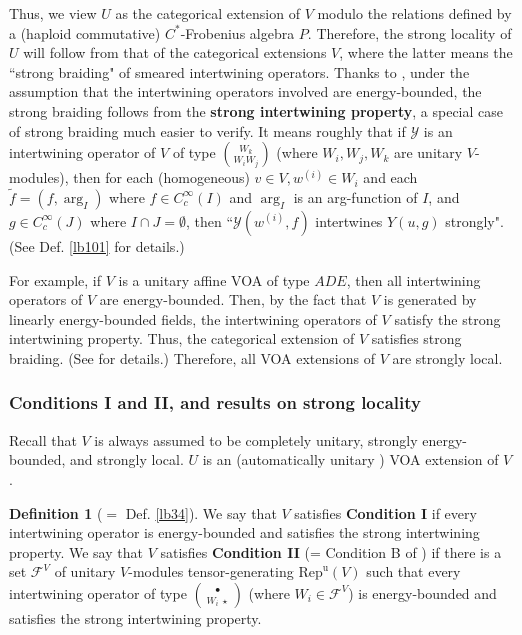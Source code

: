 \documentclass[11pt,b5paper,notitlepage]{article}
\theoremstyle{definition}
\newtheorem{df}{Definition}[section]
\theoremstyle{plain}
\newcommand{\mc}{\mathcal}
\newcommand{\wtd}{\widetilde}
\newcommand{\uni}{\mathrm{u}}
\newcommand{\RepV}{{\mathrm{Rep}^\uni(V)}}
\newcommand{\blt}{\bullet}
\numberwithin{equation}{section}
\begin{document}
Thus, we view $U$ as the categorical extension of $V$ modulo the relations defined by a (haploid commutative) $C^*$-Frobenius algebra $P$. Therefore, the strong locality of $U$ will follow from that of the categorical extensions $V$, where the latter means the ``strong braiding" of smeared intertwining operators. Thanks to \cite{Gui20}, under the assumption that the intertwining operators involved are energy-bounded, the strong braiding follows from the \textbf{strong intertwining property}, a special case of strong braiding much easier to verify. It means roughly that if $\mc Y$ is an intertwining operator of $V$ of type $W_k\choose W_iW_j$ (where $W_i,W_j,W_k$ are unitary $V$-modules), then for each (homogeneous) $v\in V,w^{(i)}\in W_i$ and each $\wtd f=(f,\arg_I)$ where $f\in C_c^\infty(I)$ and $\arg_I$ is an arg-function of $I$, and $g\in C_c^\infty(J)$ where $I\cap J=\emptyset$, then ``$\mc Y(w^{(i)},f)$ intertwines $Y(u,g)$ strongly". (See Def. \ref{lb101} for details.) 

For example, if $V$ is a unitary affine VOA of type $ADE$, then all intertwining operators of $V$ are energy-bounded. Then, by the fact that $V$ is generated by linearly energy-bounded fields, the intertwining operators of $V$ satisfy the strong intertwining property. Thus, the categorical extension of $V$ satisfies strong braiding. (See \cite[Sec. 2.7]{Gui20} for details.) Therefore, all VOA extensions of $V$ are strongly local.



\subsubsection{Conditions I and II, and results on strong locality}

Recall that $V$ is always assumed to be completely unitary, strongly energy-bounded, and strongly local. $U$ is an (automatically unitary \cite{CGGH23}) VOA extension of $V$.

\begin{df}[$=$ Def. \ref{lb34}]
We say that $V$ satisfies \textbf{Condition I} if every intertwining operator is energy-bounded and satisfies the strong intertwining property. We say that $V$ satisfies \textbf{Condition II} (= Condition B of \cite{Gui20}) if there is a set $\mc F^V$ of unitary $V$-modules tensor-generating $\RepV$ such that every intertwining operator of type $\blt\choose W_i~\star$ (where $W_i\in\mc F^V$) is energy-bounded and satisfies the strong intertwining property.
\end{df}
\end{document}
